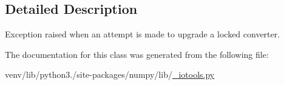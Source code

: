\subsection{Detailed Description}
\begin{DoxyVerb}Exception raised when an attempt is made to upgrade a locked converter.\end{DoxyVerb}
 

The documentation for this class was generated from the following file\+:\begin{DoxyCompactItemize}
\item 
venv/lib/python3./site-\/packages/numpy/lib/\hyperlink{__iotools_8py}{\+\_\+iotools.\+py}\end{DoxyCompactItemize}
